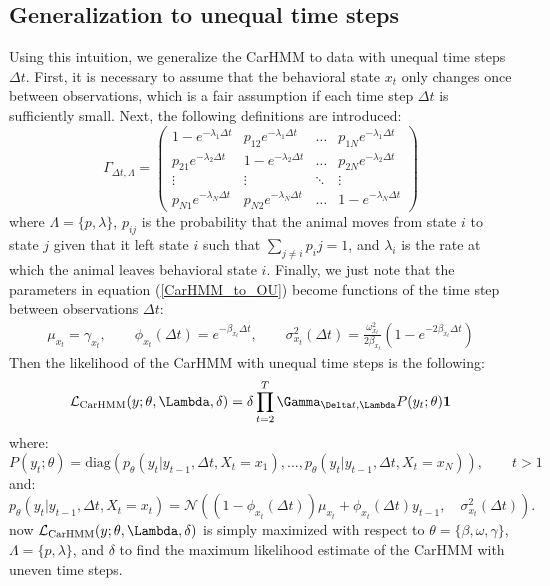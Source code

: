 \subsection{Generalization to unequal time steps}

Using this intuition, we generalize the CarHMM to data with unequal time steps $\Delta t$. First, it is necessary to assume that the behavioral state $x_t$ only changes once between observations, which is a fair assumption if each time step $\Delta t$ is sufficiently small. Next, the following definitions are introduced:
%
$$\Gamma_{\Delta t,\Lambda} = \begin{pmatrix} 
1-e^{-\lambda_1 \Delta t} & p_{12} e^{-\lambda_1 \Delta t} & \dots & p_{1N} e^{-\lambda_1 \Delta t} \\
p_{21} e^{-\lambda_2 \Delta t} & 1-e^{-\lambda_2 \Delta t} & \dots & p_{2N} e^{-\lambda_2 \Delta t} \\
\vdots & \vdots & \ddots & \vdots \\
p_{N1} e^{-\lambda_N \Delta t} & p_{N2} e^{-\lambda_N \Delta t} & \dots  & 1-e^{-\lambda_N \Delta t}
\end{pmatrix}$$
%
where $\Lambda = \{p,\lambda\}$, $p_{ij}$ is the probability that the animal moves from state $i$ to state $j$ given that it left state $i$ such that $\sum_{j \neq i} p_ij = 1$, and $\lambda_i$ is the rate at which the animal leaves behavioral state $i$. Finally, we just note that the parameters in equation (\ref{CarHMM_to_OU}) become functions of the time step between observations $\Delta t$:
%
\begin{align*}
\mu_{x_t}= \gamma_{x_t}, \qquad \phi_{x_t}(\Delta t) = e^{-\beta_{x_t}\Delta t}, \qquad \sigma^2_{x_t}(\Delta t) = \frac{\omega_{x_t}^2}{2\beta_{x_t}} (1-e^{-2\beta_{x_t}\Delta t})
\end{align*}
%
Then the likelihood of the CarHMM with unequal time steps is the following:
%
$$\calL_{\text{CarHMM}}(y;\theta,\Lambda,\delta) = \delta \prod_{t=2}^{T} \Gamma_{\Delta t,\Lambda} P(y_t;\theta) \mathbf{1}$$
%
where:
%
$$P(y_t;\theta) = \text{diag}(p_\theta(y_t|y_{t-1}, \Delta t, X_t = x_1), . . . , p_\theta(y_t|y_{t-1}, \Delta t, X_t = x_N )), \qquad t > 1$$
%
and:
%
$$p_\theta(y_t|y_{t-1}, \Delta t, X_t = x_t) = \mathcal{N}\left((1-\phi_{x_t}(\Delta t))\mu_{x_t} + \phi_{x_t}(\Delta t) y_{t-1},\quad \sigma_{x_t}^2(\Delta t) \right).$$
%
now $\calL_{\text{CarHMM}}(y;\theta,\Lambda,\delta)$ is simply maximized with respect to $\theta = \{\beta,\omega,\gamma\}$, $\Lambda = \{p,\lambda\}$, and $\delta$ to find the maximum likelihood estimate of the CarHMM with uneven time steps.

